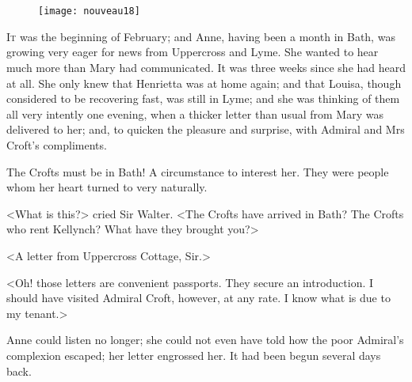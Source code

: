 \chapter[Chapter \thechapter]{}
	
	\begin{figure}[t!]
\centering
\texttt{[image: nouveau18]}
\end{figure}

\lettrine[lraise=0.3]{I}{t} was the beginning of February; and Anne, having been a month in Bath, was growing very eager for news from Uppercross and Lyme. She wanted to hear much more than Mary had communicated. It was three weeks since she had heard at all. She only knew that Henrietta was at home again; and that Louisa, though considered to be recovering fast, was still in Lyme; and she was thinking of them all very intently one evening, when a thicker letter than usual from Mary was delivered to her; and, to quicken the pleasure and surprise, with Admiral and Mrs Croft's compliments.

The Crofts must be in Bath! A circumstance to interest her. They were people whom her heart turned to very naturally.

<What is this?> cried Sir Walter. <The Crofts have arrived in Bath? The Crofts who rent Kellynch? What have they brought you?>

<A letter from Uppercross Cottage, Sir.>

<Oh! those letters are convenient passports. They secure an introduction. I should have visited Admiral Croft, however, at any rate. I know what is due to my tenant.>

Anne could listen no longer; she could not even have told how the poor Admiral's complexion escaped; her letter engrossed her. It had been begun several days back.

